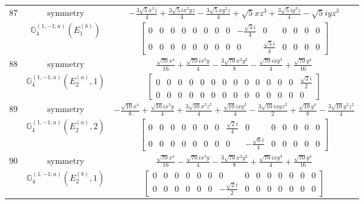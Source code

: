 \documentclass[fleqn,8pt,landscape]{jsarticle}
\begin{document}
\begin{longtable}{ccc}
$ 87 $ & $ \text{symmetry} $ & $ - \frac{3 \sqrt{5} x^{3} z}{4} + \frac{3 \sqrt{5} i x^{2} y z}{4} - \frac{3 \sqrt{5} x y^{2} z}{4} + \sqrt{5} x z^{3} + \frac{3 \sqrt{5} i y^{3} z}{4} - \sqrt{5} i y z^{3} $ \\
$  $ & $ \mathbb{G}_{4}^{(1,-1;a)}(E_{1}^{(b)}) $ & $ \begin{bmatrix} 0 & 0 & 0 & 0 & 0 & 0 & 0 & 0 & - \frac{\sqrt{3} i}{4} & 0 & 0 & 0 & 0 & 0 \\ 0 & 0 & 0 & 0 & 0 & 0 & 0 & 0 & 0 & \frac{\sqrt{5} i}{4} & 0 & 0 & 0 & 0 \end{bmatrix} $ \\ \hline
$ 88 $ & $ \text{symmetry} $ & $ \frac{\sqrt{70} x^{4}}{16} + \frac{\sqrt{70} i x^{3} y}{4} - \frac{3 \sqrt{70} x^{2} y^{2}}{8} - \frac{\sqrt{70} i x y^{3}}{4} + \frac{\sqrt{70} y^{4}}{16} $ \\
$  $ & $ \mathbb{G}_{4}^{(1,-1;a)}(E_{2}^{(a)},1) $ & $ \begin{bmatrix} 0 & 0 & 0 & 0 & 0 & 0 & 0 & 0 & 0 & 0 & 0 & 0 & 0 & \frac{\sqrt{2} i}{2} \\ 0 & 0 & 0 & 0 & 0 & 0 & 0 & 0 & 0 & 0 & 0 & 0 & 0 & 0 \end{bmatrix} $ \\ \hline
$ 89 $ & $ \text{symmetry} $ & $ - \frac{\sqrt{10} x^{4}}{8} + \frac{\sqrt{10} i x^{3} y}{4} + \frac{3 \sqrt{10} x^{2} z^{2}}{4} + \frac{\sqrt{10} i x y^{3}}{4} - \frac{3 \sqrt{10} i x y z^{2}}{2} + \frac{\sqrt{10} y^{4}}{8} - \frac{3 \sqrt{10} y^{2} z^{2}}{4} $ \\
$  $ & $ \mathbb{G}_{4}^{(1,-1;a)}(E_{2}^{(a)},2) $ & $ \begin{bmatrix} 0 & 0 & 0 & 0 & 0 & 0 & 0 & \frac{\sqrt{2} i}{4} & 0 & 0 & 0 & 0 & 0 & 0 \\ 0 & 0 & 0 & 0 & 0 & 0 & 0 & 0 & - \frac{\sqrt{6} i}{4} & 0 & 0 & 0 & 0 & 0 \end{bmatrix} $ \\ \hline
$ 90 $ & $ \text{symmetry} $ & $ \frac{\sqrt{70} x^{4}}{16} - \frac{\sqrt{70} i x^{3} y}{4} - \frac{3 \sqrt{70} x^{2} y^{2}}{8} + \frac{\sqrt{70} i x y^{3}}{4} + \frac{\sqrt{70} y^{4}}{16} $ \\
$  $ & $ \mathbb{G}_{4}^{(1,-1;a)}(E_{2}^{(b)},1) $ & $ \begin{bmatrix} 0 & 0 & 0 & 0 & 0 & 0 & 0 & 0 & 0 & 0 & 0 & 0 & 0 & 0 \\ 0 & 0 & 0 & 0 & 0 & 0 & - \frac{\sqrt{2} i}{2} & 0 & 0 & 0 & 0 & 0 & 0 & 0 \end{bmatrix} $ \\ \hline

\end{longtable}
\end{document}
